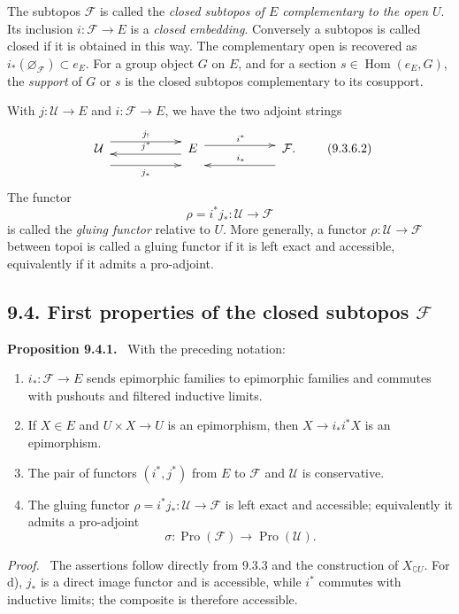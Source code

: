 \documentclass[11pt]{article}
\newcommand{\Uu}{\mathcal{U}}
\newcommand{\Ff}{\mathcal{F}}
\newcommand{\Hom}{\operatorname{Hom}}
\newcommand{\Pro}{\operatorname{Pro}}
\newenvironment{statement}[1]{\par\medskip\noindent\textbf{#1.}\ }{\par\medskip}
\newenvironment{prooftext}{\par\noindent\emph{Proof.}\ }{\par\medskip}
\begin{document}
The subtopos \(\Ff\) is called the \emph{closed subtopos of \(E\) complementary to the open \(U\)}. Its inclusion \(i:\Ff\to E\) is a \emph{closed embedding}. Conversely a subtopos is called closed if it is obtained in this way. The complementary open is recovered as \(i_*(\varnothing_\Ff)\subset e_E\). For a group object \(G\) on \(E\), and for a section \(s\in\Hom(e_E,G)\), the \emph{support} of \(G\) or \(s\) is the closed subtopos complementary to its cosupport.

With \(j:\Uu\to E\) and \(i:\Ff\to E\), we have the two adjoint strings
\[
\xymatrix@C=2cm@R=1.5cm@M=.2cm{
\Uu\ar@<6pt>[r]^{j_!}\ar@<-13pt>[r]_{j_*}&
E\ar@<3pt>[r]^{i^*}\ar@<4pt>[l]_{j^*}&
\Ff\ar@<13pt>[l]_{i_*}.}
\tag{9.3.6.2}
\]
The functor
\[
\rho=i^*j_*:\Uu\longrightarrow\Ff
\tag{9.3.6.3}
\]
is called the \emph{gluing functor} relative to \(U\). More generally, a functor \(\rho:\Uu\to\Ff\) between topoi is called a gluing functor if it is left exact and accessible, equivalently if it admits a pro-adjoint.

\subsection*{9.4. First properties of the closed subtopos \(\Ff\)}

\begin{statement}{Proposition 9.4.1}
With the preceding notation:
\begin{enumerate}[label=\alph*)]
\item \(i_*:\Ff\to E\) sends epimorphic families to epimorphic families and commutes with pushouts and filtered inductive limits.
\item If \(X\in E\) and \(U\times X\to U\) is an epimorphism, then \(X\to i_*i^*X\) is an epimorphism.
\item The pair of functors \((i^*,j^*)\) from \(E\) to \(\Ff\) and \(\Uu\) is conservative.
\item The gluing functor \(\rho=i^*j_*:\Uu\to\Ff\) is left exact and accessible; equivalently it admits a pro-adjoint
\[
\sigma:\Pro(\Ff)\longrightarrow\Pro(\Uu).
\]
\end{enumerate}
\end{statement}

\begin{prooftext}
The assertions follow directly from 9.3.3 and the construction of \(X_{\complement U}\). For d), \(j_*\) is a direct image functor and is accessible, while \(i^*\) commutes with inductive limits; the composite is therefore accessible.
\end{prooftext}
\end{document}
